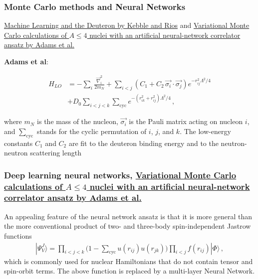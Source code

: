 \documentclass[11pt]{beamer} %
\begin{document}
\begin{frame}
\frametitle{Monte Carlo methods and Neural Networks}

\href{{https://www.sciencedirect.com/science/article/pii/S0370269320305463?via%3Dihub}}{Machine Learning and the Deuteron by Kebble and Rios} and
\href{{https://journals.aps.org/prl/abstract/10.1103/PhysRevLett.127.022502}}{Variational Monte Carlo calculations of $A\le 4$ nuclei with an artificial neural-network correlator ansatz by Adams et al.}

\textbf{Adams et al}:

\begin{align}
H_{LO} &=-\sum_i \frac{{\vec{\nabla}_i^2}}{2m_N}
+\sum_{i<j} {\left(C_1  + C_2\, \vec{\sigma_i}\cdot\vec{\sigma_j}\right)
e^{-r_{ij}^2\Lambda^2 / 4 }}
\nonumber\\
&+D_0 \sum_{i<j<k} \sum_{\text{cyc}}
{e^{-\left(r_{ik}^2+r_{ij}^2\right)\Lambda^2/4}}\,,
\end{align}

where $m_N$ is the mass of the nucleon, $\vec{\sigma_i}$ is the Pauli
matrix acting on nucleon $i$, and $\sum_{\text{cyc}}$ stands for the
cyclic permutation of $i$, $j$, and $k$. The low-energy constants
$C_1$ and $C_2$ are fit to the deuteron binding energy and to the
neutron-neutron scattering length
\end{frame}

\begin{frame}
\frametitle{Deep learning neural networks, \href{{https://journals.aps.org/prl/abstract/10.1103/PhysRevLett.127.022502}}{Variational Monte Carlo calculations of $A\le 4$ nuclei with an artificial neural-network correlator ansatz by Adams et al.}}

An appealing feature of the neural network ansatz is that it is more general than the more conventional product of two-
and three-body spin-independent Jastrow functions
\begin{align}
|\Psi_V^J \rangle = \prod_{i<j<k} \Big( 1-\sum_{\text{cyc}} u(r_{ij}) u(r_{jk})\Big) \prod_{i<j} f(r_{ij}) | \Phi\rangle\,,
\end{align}
which is commonly used for nuclear Hamiltonians that do not contain tensor and spin-orbit terms.
The above function is replaced by a multi-layer Neural Network.
\end{frame}
\end{document}
